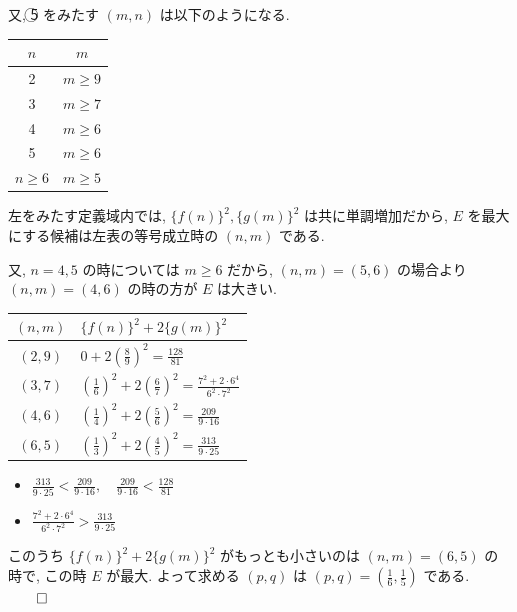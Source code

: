 \documentclass[../main.tex]{subfiles}
\begin{document}
\noindent
又, \textcircled{5} をみたす $(m,n)$ は以下のようになる.

\begin{center}
  \begin{tabular}{c|c}
    $n$ & $m$ \\ \hline
    2 & $m \ge 9$ \\ \hline
    3 & $m \ge 7$ \\ \hline
    4 & $m \ge 6$ \\ \hline
    5 & $m \ge 6$ \\ \hline
    $n \ge 6$ & $m \ge 5$
  \end{tabular}
\end{center}

\noindent
左をみたす定義域内では, $\{f(n)\}^2, \{g(m)\}^2$ は共に単調増加だから, $E$ を最大にする候補は左表の等号成立時の $(n,m)$ である.

\noindent
又, $n = 4, 5$ の時については $m \ge 6$ だから, $(n,m) = (5,6)$ の場合より $(n,m) = (4,6)$ の時の方が $E$ は大きい.

\begin{center}
  \begin{tabular}{c|l}
    $(n,m)$ & $\{f(n)\}^2 + 2\{g(m)\}^2$ \\ \hline
    $(2,9)$ & $0 + 2\left(\frac{8}{9}\right)^2 = \frac{128}{81}$ \\ \hline
    $(3,7)$ & $\left(\frac{1}{6}\right)^2 + 2\left(\frac{6}{7}\right)^2 = \frac{7^2 + 2 \cdot 6^4}{6^2 \cdot 7^2}$ \\ \hline
    $(4,6)$ & $\left(\frac{1}{4}\right)^2 + 2\left(\frac{5}{6}\right)^2 = \frac{209}{9 \cdot 16}$ \\ \hline
    $(6,5)$ & $\left(\frac{1}{3}\right)^2 + 2\left(\frac{4}{5}\right)^2 = \frac{313}{9 \cdot 25}$
  \end{tabular}
\end{center}

\begin{itemize}
  \item $\displaystyle \frac{313}{9 \cdot 25} < \frac{209}{9 \cdot 16}, \quad \frac{209}{9 \cdot 16} < \frac{128}{81}$
  \item $\displaystyle \frac{7^2 + 2 \cdot 6^4}{6^2 \cdot 7^2} > \frac{313}{9 \cdot 25}$
\end{itemize}

\noindent
このうち $\{f(n)\}^2 + 2\{g(m)\}^2$ がもっとも小さいのは $(n,m) = (6,5)$ の時で, この時 $E$ が最大. よって求める $(p,q)$ は $(p,q) = \left(\frac{1}{6}, \frac{1}{5}\right)$ である. \hfill $\qed$
\end{document}
